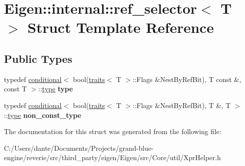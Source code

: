 \hypertarget{struct_eigen_1_1internal_1_1ref__selector}{}\section{Eigen\+::internal\+::ref\+\_\+selector$<$ T $>$ Struct Template Reference}
\label{struct_eigen_1_1internal_1_1ref__selector}
\subsection*{Public Types}
\begin{DoxyCompactItemize}
\item 
\mbox{\label{struct_eigen_1_1internal_1_1ref__selector_a21d6a5a42df0968101d42b6c79ed847b}} 
typedef \mbox{\hyperlink{struct_eigen_1_1internal_1_1conditional}{conditional}}$<$ bool(\mbox{\hyperlink{struct_eigen_1_1internal_1_1traits}{traits}}$<$ T $>$\+::Flags \&Nest\+By\+Ref\+Bit), T const  \&, const T $>$\+::\mbox{\hyperlink{struct_eigen_1_1internal_1_1true__type}{type}} {\bfseries type}
\item 
\mbox{\label{struct_eigen_1_1internal_1_1ref__selector_a01ab072ffc5c112beb8021a3e8311b80}} 
typedef \mbox{\hyperlink{struct_eigen_1_1internal_1_1conditional}{conditional}}$<$ bool(\mbox{\hyperlink{struct_eigen_1_1internal_1_1traits}{traits}}$<$ T $>$\+::Flags \&Nest\+By\+Ref\+Bit), T \&, T $>$\+::\mbox{\hyperlink{struct_eigen_1_1internal_1_1true__type}{type}} {\bfseries non\+\_\+const\+\_\+type}
\end{DoxyCompactItemize}


The documentation for this struct was generated from the following file\+:\begin{DoxyCompactItemize}
\item 
C\+:/\+Users/dante/\+Documents/\+Projects/grand-\/blue-\/engine/reverie/src/third\+\_\+party/eigen/\+Eigen/src/\+Core/util/Xpr\+Helper.\+h\end{DoxyCompactItemize}
